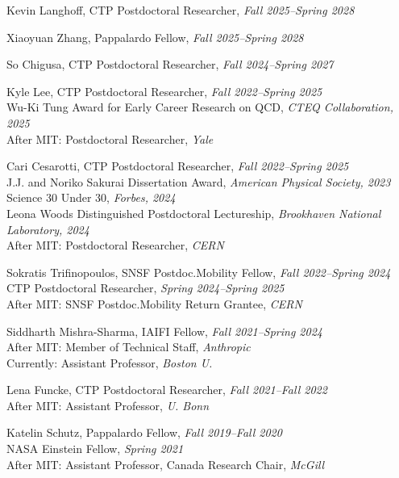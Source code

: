 \bbl

\item Kevin Langhoff, CTP Postdoctoral Researcher, \emph{Fall 2025--Spring 2028}

\item Xiaoyuan Zhang, Pappalardo Fellow, \emph{Fall 2025--Spring 2028}

\item So Chigusa, CTP Postdoctoral Researcher, \emph{Fall 2024--Spring 2027}

\item Kyle Lee, CTP Postdoctoral Researcher, \emph{Fall 2022--Spring 2025}
\\ Wu-Ki Tung Award for Early Career Research on QCD, \emph{CTEQ Collaboration, 2025}
\\ After MIT: Postdoctoral Researcher, \emph{Yale}

\item Cari Cesarotti, CTP Postdoctoral Researcher, \emph{Fall 2022--Spring 2025}
\\ J.J. and Noriko Sakurai Dissertation Award, \emph{American Physical Society, 2023}
\\ Science 30 Under 30, \emph{Forbes, 2024}
\\ Leona Woods Distinguished Postdoctoral Lectureship, \emph{Brookhaven National Laboratory, 2024}
\\ After MIT: Postdoctoral Researcher, \emph{CERN}

\item Sokratis Trifinopoulos, SNSF Postdoc.Mobility Fellow, \emph{Fall 2022--Spring 2024}
\\ CTP Postdoctoral Researcher, \emph{Spring 2024--Spring 2025}
\\ After MIT: SNSF Postdoc.Mobility Return Grantee, \emph{CERN}

\item Siddharth Mishra-Sharma, IAIFI Fellow, \emph{Fall 2021--Spring 2024}
\\ After MIT: Member of Technical Staff, \emph{Anthropic}
\\ Currently: Assistant Professor, \emph{Boston U.}

\item Lena Funcke, CTP Postdoctoral Researcher, \emph{Fall 2021--Fall 2022}
\\ After MIT: Assistant Professor, \emph{U. Bonn}

\item Katelin Schutz, Pappalardo Fellow, \emph{Fall 2019--Fall 2020}
\\ NASA Einstein Fellow, \emph{Spring 2021}
\\ After MIT: Assistant Professor, Canada Research Chair, \emph{McGill}

